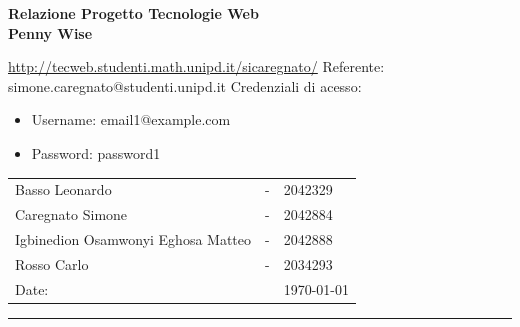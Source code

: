 \begin{titlepage}
\noindent{}
\vspace{15pt}
\textcolor{UM_Brown}{
\begin{flushleft}
    \textbf{\huge{Relazione Progetto Tecnologie Web}}\\
    \vspace{15pt}
    \huge \textbf{Penny Wise} \\
    \vspace{15pt}
	\begin{large}
    \url{http://tecweb.studenti.math.unipd.it/sicaregnato/}
	\newline
    Referente: simone.caregnato@studenti.unipd.it
	\newline
	Credenziali di acesso:
		\begin{itemize}
			\item[] Username: email1@example.com
			\item[] Password: password1
		\end{itemize}
	\end{large}
\end{flushleft}
}
\vspace{55pt}
\textcolor{UM_Brown}{
\begin{flushright}
\begin{tabular}{lcl}
    Basso Leonardo & - & 2042329 \\
    Caregnato Simone & - & 2042884 \\
    Igbinedion Osamwonyi Eghosa Matteo & - & 2042888 \\
    Rosso Carlo & - & 2034293 \\
    Date: &  & \today
\end{tabular}
\end{flushright}
\hrule
}
\end{titlepage}
